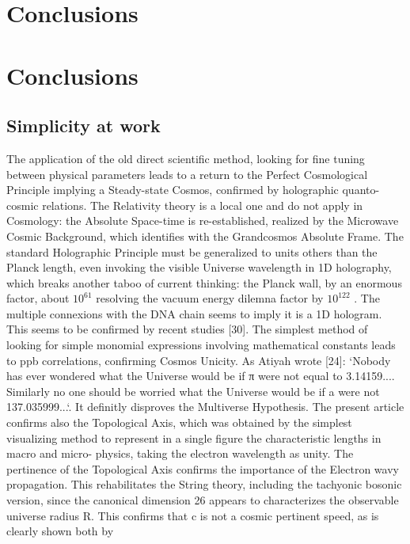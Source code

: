 \chapter{Conclusions}
\label{chap:chapter_5}
\chapter{Conclusions}
\section {Simplicity at work}

The application of the old direct scientific method, looking for fine tuning between physical
parameters leads to a return to the Perfect Cosmological Principle implying a Steady-state Cosmos,
confirmed by holographic quanto-cosmic relations. The Relativity theory is a local one and do not
apply in Cosmology: the Absolute Space-time is re-established, realized by the Microwave Cosmic
Background, which identifies with the Grandcosmos Absolute Frame.
The standard Holographic Principle must be generalized to units others than the Planck length,
even invoking the visible Universe wavelength in 1D holography, which breaks another taboo of
current thinking: the Planck wall, by an enormous factor, about $10^{61}$ resolving the vacuum energy
dilemna factor by $10^{122}$ .
The multiple connexions with the DNA chain seems to imply it is a 1D hologram. This seems to
be confirmed by recent studies [30].
The simplest method of looking for simple monomial expressions involving mathematical
constants leads to ppb correlations, confirming Cosmos Unicity. As Atiyah wrote [24]: `Nobody has
ever wondered what the Universe would be if π were not equal to 3.14159.... Similarly no one
should be worried what the Universe would be if a were not 137.035999...`. It definitly
disproves the Multiverse Hypothesis.
The present article confirms also the Topological Axis, which was obtained by the simplest
visualizing method to represent in a single figure the characteristic lengths in macro and micro-
physics, taking the electron wavelength as unity. The pertinence of the Topological Axis confirms
the importance of the Electron wavy propagation. This rehabilitates the String theory, including the
tachyonic bosonic version, since the canonical dimension 26 appears to characterizes the observable
universe radius R. This confirms that c is not a cosmic pertinent speed, as is clearly shown both by
